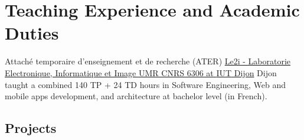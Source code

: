 


\section{Teaching Experience and Academic Duties}


{Attach\'{e} temporaire d'enseignement et de recherche (ATER)}
{\href{http://le2i.cnrs.fr/?lang=en}{Le2i - Laboratorie Electronique, Informatique et Image {UMR CNRS} 6306 at {IUT} Dijon}}
{}
{Dijon}
{
  taught a combined 140 TP + 24 TD hours in Software Engineering, Web and mobile apps
  development, and architecture at bachelor level (in French).
}

\subsection{Projects}

